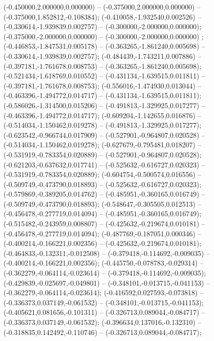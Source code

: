  (-0.450000,2.000000,0.000000) -- (-0.375000,2.000000,0.000000) -- (-0.375000,1.852812,-0.108384);
 (-0.410058,-1.932540,0.002526) -- (-0.330614,-1.939839,0.002757) -- (-0.300000,-2.000000,0.000000);
 (-0.375000,-2.000000,0.000000) -- (-0.300000,-2.000000,0.000000) ;
 (-0.446853,-1.847531,0.005178) -- (-0.363265,-1.861240,0.005698) -- (-0.330614,-1.939839,0.002757);
 (-0.484439,-1.743211,0.007886) -- (-0.397181,-1.761678,0.008753) -- (-0.363265,-1.861240,0.005698);
 (-0.521434,-1.618769,0.010552) -- (-0.431134,-1.639515,0.011811) -- (-0.397181,-1.761678,0.008753);
 (-0.556016,-1.474930,0.013044) -- (-0.463396,-1.494772,0.014717) -- (-0.431134,-1.639515,0.011811);
 (-0.586026,-1.314500,0.015206) -- (-0.491813,-1.329925,0.017277) -- (-0.463396,-1.494772,0.014717);
 (-0.609204,-1.142655,0.016876) -- (-0.514034,-1.150462,0.019278) -- (-0.491813,-1.329925,0.017277);
 (-0.623542,-0.966744,0.017909) -- (-0.527901,-0.964807,0.020528) -- (-0.514034,-1.150462,0.019278);
 (-0.627679,-0.795481,0.018207) -- (-0.531919,-0.783354,0.020889) -- (-0.527901,-0.964807,0.020528);
 (-0.621203,-0.637632,0.017741) -- (-0.525632,-0.616727,0.020323) -- (-0.531919,-0.783354,0.020889);
 (-0.604754,-0.500574,0.016556) -- (-0.509749,-0.473790,0.018893) -- (-0.525632,-0.616727,0.020323);
 (-0.579869,-0.389205,0.014762) -- (-0.485951,-0.360165,0.016749) -- (-0.509749,-0.473790,0.018893);
 (-0.548647,-0.305505,0.012513) -- (-0.456478,-0.277719,0.014094) -- (-0.485951,-0.360165,0.016749);
 (-0.515482,-0.243959,0.008807) -- (-0.425632,-0.219674,0.010181) -- (-0.456478,-0.277719,0.014094);
 (-0.487769,-0.187051,0.000346) -- (-0.400214,-0.166221,0.002356) -- (-0.425632,-0.219674,0.010181);
 (-0.464833,-0.132311,-0.012508) -- (-0.379418,-0.114692,-0.009035) -- (-0.400214,-0.166221,0.002356);
 (-0.445750,-0.078783,-0.029314) -- (-0.362279,-0.064114,-0.023614) -- (-0.379418,-0.114692,-0.009035);
 (-0.429839,-0.025697,-0.049801) -- (-0.348101,-0.013715,-0.041153) -- (-0.362279,-0.064114,-0.023614);
 (-0.416592,0.027593,-0.073818) -- (-0.336373,0.037149,-0.061532) -- (-0.348101,-0.013715,-0.041153);
 (-0.405621,0.081656,-0.101311) -- (-0.326713,0.089044,-0.084717) -- (-0.336373,0.037149,-0.061532);
 (-0.396634,0.137016,-0.132310) -- (-0.318835,0.142492,-0.110746) -- (-0.326713,0.089044,-0.084717);
